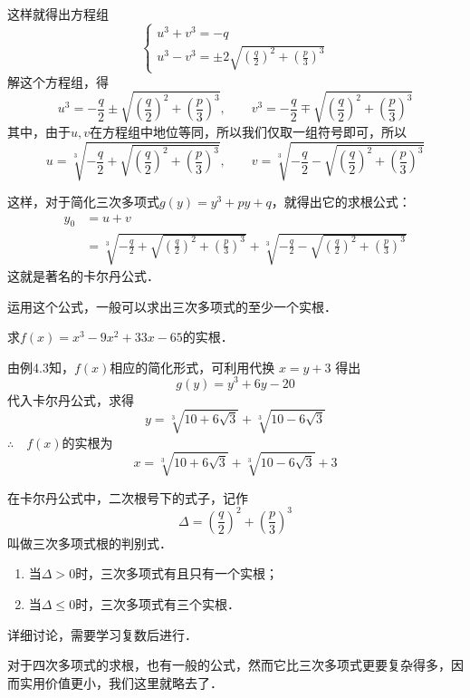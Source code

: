 这样就得出方程组
\[\begin{cases}
    u^3+v^3=-q\\
    u^3-v^3=\pm 2\sqrt{\left(\frac{q}{2}\right)^2+\left(\frac{p}{3}\right)^3}
\end{cases}\]
解这个方程组，得
\[u^3=-\frac{q}{2}\pm \sqrt{\left(\frac{q}{2}\right)^2+\left(\frac{p}{3}\right)^3},\qquad v^3=-\frac{q}{2}\mp \sqrt{\left(\frac{q}{2}\right)^2+\left(\frac{p}{3}\right)^3}\]
其中，由于$u,v$在方程组中地位等同，所以我们仅取一组符号即可，所以
\[u=\sqrt[3]{-\frac{q}{2}+ \sqrt{\left(\frac{q}{2}\right)^2+\left(\frac{p}{3}\right)^3}},\qquad v=\sqrt[3]{-\frac{q}{2}- \sqrt{\left(\frac{q}{2}\right)^2+\left(\frac{p}{3}\right)^3}}\]

这样，对于简化三次多项式$g(y)=y^3+py+q$，就得出它的求根公式：
\[\begin{split}
    y_0&=u+v\\
    &=\sqrt[3]{-\frac{q}{2}+ \sqrt{\left(\frac{q}{2}\right)^2+\left(\frac{p}{3}\right)^3}}+\sqrt[3]{-\frac{q}{2}- \sqrt{\left(\frac{q}{2}\right)^2+\left(\frac{p}{3}\right)^3}}
\end{split}\]
这就是著名的卡尔丹公式．

运用这个公式，一般可以求出三次多项式的至少一个实根．


\begin{example}
    求$f(x)=x^3-9x^2+33x-65$的实根．
\end{example}

\begin{solution}
    由例4.3知，$f(x)$相应的简化形式，可利用代换
$x=y+3$ 得出
\[g(y)=y^3+6y-20\]
代入卡尔丹公式，求得
\[y=\sqrt[3]{10+6\sqrt{3}}+\sqrt[3]{10-6\sqrt{3}}\]
$\therefore\quad f(x)$的实根为
\[x=\sqrt[3]{10+6\sqrt{3}}+\sqrt[3]{10-6\sqrt{3}}+3\]
\end{solution}

\begin{rmk}
在卡尔丹公式中，二次根号下的式子，记作
\[\Delta=\left(\frac{q}{2}\right)^2+\left(\frac{p}{3}\right)^3\]
叫做三次多项式根的判别式．
\begin{enumerate}
    \item 当$\Delta>0$时，三次多项式有且只有一个实根；
    \item 当$\Delta\le 0$时，三次多项式有三个实根．
\end{enumerate}
详细讨论，需要学习复数后进行．
\end{rmk}

对于四次多项式的求根，也有一般的公式，然而它比三次多项式更要复杂得多，因而实用价值更小，我们这里就略去了．

